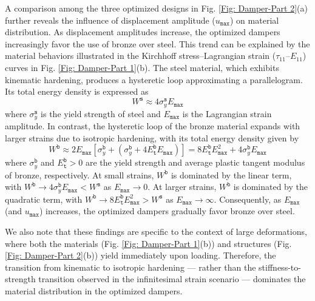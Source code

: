 \documentclass[preprint,11pt]{elsarticle}
\theoremstyle{definition}
\begin{document}
A comparison among the three optimized designs in Fig. \ref{Fig: Damper-Part 2}(a) further reveals the influence of displacement amplitude ($u_\texttt{max}$) on material distribution. As displacement amplitudes increase, the optimized dampers increasingly favor the use of bronze over steel. This trend can be explained by the material behaviors illustrated in the Kirchhoff stress--Lagrangian strain ($\tau_{11}$--$E_{11}$) curves in Fig. \ref{Fig: Damper-Part 1}(b). The steel material, which exhibits kinematic hardening, produces a hysteretic loop approximating a parallelogram. Its total energy density is expressed as
\begin{equation} \label{Total Energy Density of Steel}
    W^\texttt{s} \approx 4 \sigma_y^\texttt{s} E_\texttt{max}
\end{equation}
where $\sigma_y^\texttt{s}$ is the yield strength of steel and $E_\texttt{max}$ is the Lagrangian strain amplitude. In contrast, the hysteretic loop of the bronze material expands with larger strains due to isotropic hardening, with its total energy density given by
\begin{equation} \label{Total Energy Density of Bronze}
    W^\texttt{b} \approx 2 E_\texttt{max} \left[ \sigma_y^\texttt{b} + (\sigma_y^\texttt{b} + 4 E_\texttt{t}^\texttt{b} E_\texttt{max}) \right]
    = 8 E_\texttt{t}^\texttt{b} E_\texttt{max}^2 + 4 \sigma_y^\texttt{b} E_\texttt{max}
\end{equation}
where $\sigma_y^\texttt{b}$ and $E_\texttt{t}^\texttt{b} > 0$ are the yield strength and average plastic tangent modulus of bronze, respectively. At small strains, $W^\texttt{b}$ is dominated by the linear term, with $W^\texttt{b} \rightarrow 4 \sigma_y^\texttt{b} E_\texttt{max} < W^\texttt{s}$ as $E_\texttt{max} \rightarrow 0$. At larger strains, $W^\texttt{b}$ is dominated by the quadratic term, with $W^\texttt{b} \rightarrow 8 E_\texttt{t}^\texttt{b} E_\texttt{max}^2 > W^\texttt{s}$ as $E_\texttt{max} \rightarrow \infty$. Consequently, as $E_\texttt{max}$ (and $u_\texttt{max}$) increases, the optimized dampers gradually favor bronze over steel.

We also note that these findings are specific to the context of large deformations, where both the materials (Fig. \ref{Fig: Damper-Part 1}(b)) and structures (Fig. \ref{Fig: Damper-Part 2}(b)) yield immediately upon loading. Therefore, the transition from kinematic to isotropic hardening --- rather than the stiffness-to-strength transition observed in the infinitesimal strain scenario \citep{jia_multimaterial_2025} --- dominates the material distribution in the optimized dampers.
\end{document}
